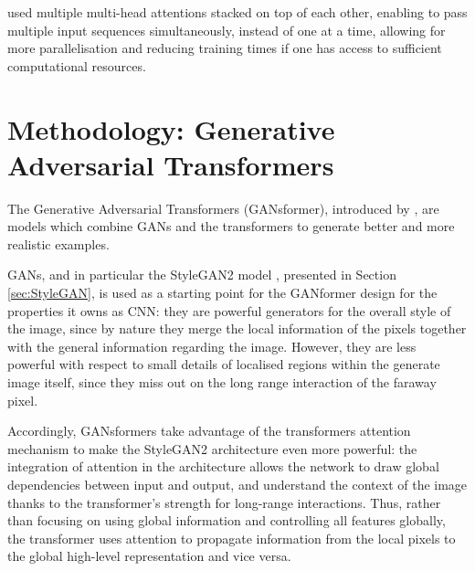 \documentclass{article}
\begin{document}

\citet{vaswani2017attention}used multiple multi-head attentions stacked on top of each other, 
enabling to pass multiple input sequences simultaneously, instead of one at a time, allowing for 
more parallelisation and reducing training times if one has access to sufficient computational 
resources.

\section{Methodology: Generative Adversarial Transformers}\label{sec:ganformer}

The Generative Adversarial Transformers (GANsformer), introduced by 
\citet{hudson2021generative}, are models which combine GANs and the transformers to 
generate 
better and more realistic examples.

GANs, and in particular the StyleGAN2 model \cite{karras2020analyzing}, presented in Section 
\ref{sec:StyleGAN}, %
is used as a starting point for the 
GANformer design for the properties it owns as CNN: they are powerful generators for the overall 
style of the image, since by nature they merge the local information of the pixels together with the 
general information regarding the image. 
However, they are less powerful with respect to small details of localised regions within the 
generate 
image itself, since they miss out on the long range interaction of the faraway pixel.

Accordingly, GANsformers take advantage of the transformers attention mechanism to make the 
StyleGAN2 architecture even more powerful: the integration of attention in the architecture allows 
the network to draw global dependencies between input and output, and understand the context of 
the image thanks to the transformer's strength for long-range interactions.
Thus, rather than focusing on using global information and controlling all features globally, 
the transformer uses attention to propagate information from the local pixels to the global high-level 
representation and vice versa. 
\end{document}
